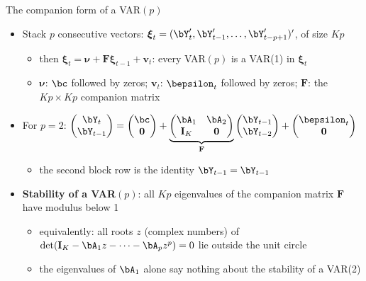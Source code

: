 \begin{frame}{The companion form of a VAR$(p)$}
\itemsize{\small}
\begin{itemize}
    \item Stack $p$ consecutive vectors: $\boldsymbol{\xi}_t = (\bY_t', \bY_{t-1}', \dots, \bY_{t-p+1}')'$, of size $Kp$
    \begin{itemize}
        \item then $\boldsymbol{\xi}_t = \boldsymbol{\nu} + \mathbf{F}\boldsymbol{\xi}_{t-1} + \mathbf{v}_t$: every VAR$(p)$ is a VAR(1) in $\boldsymbol{\xi}_t$
        \item $\boldsymbol{\nu}$: $\bc$ followed by zeros; $\mathbf{v}_t$: $\bepsilon_t$ followed by zeros; $\mathbf{F}$: the $Kp \times Kp$ companion matrix
    \end{itemize}
    \item For $p = 2$: $\begin{pmatrix} \bY_t \\ \bY_{t-1} \end{pmatrix} = \begin{pmatrix} \bc \\ \mathbf{0} \end{pmatrix} + \underbrace{\begin{pmatrix} \bA_1 & \bA_2 \\ \mathbf{I}_K & \mathbf{0} \end{pmatrix}}_{\mathbf{F}}\begin{pmatrix} \bY_{t-1} \\ \bY_{t-2} \end{pmatrix} + \begin{pmatrix} \bepsilon_t \\ \mathbf{0} \end{pmatrix}$
    \begin{itemize}
        \item the second block row is the identity $\bY_{t-1} = \bY_{t-1}$
    \end{itemize}
    \item \textbf{Stability of a VAR$(p)$}: all $Kp$ eigenvalues of the companion matrix $\mathbf{F}$ have modulus below 1
    \begin{itemize}
        \item equivalently: all roots $z$ (complex numbers) of $\det(\mathbf{I}_K - \bA_1z - \dots - \bA_pz^p) = 0$ lie outside the unit circle
        \item the eigenvalues of $\bA_1$ alone say nothing about the stability of a VAR(2)
    \end{itemize}
\end{itemize}
\end{frame}

